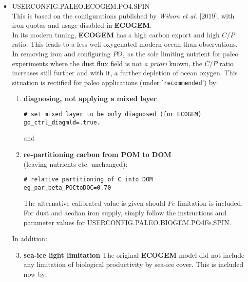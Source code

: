 \begin{itemize}[noitemsep]
\vspace{2mm}
\item \textsf{\small USERCONFIG.PALEO.ECOGEM.PO4.SPIN}
\vspace{1mm}
\\This is based on the configurations published by \textit{Wilson et al.} [2019], with iron quotas and usage disabled in \textbf{ECOGEM}.
\\In its modern tuning, \textbf{ECOGEM} has a high carbon export and high \(C/P\) ratio. This leads to a less well oxygenated modern ocean than observations. In removing iron and configuring \(PO_{4}\) as the sole limiting nutrient for paleo experiments where the dust flux field is not \textit{a priori} known, the \(C/P\) ratio increases still further and with it, a further depletion of ocean oxygen. This situation is rectified for paleo applications (under '\texttt{recommended}') by:
\begin{enumerate}[noitemsep]
\vspace{1mm}
\item \textbf{diagnosing, not applying a mixed layer}
\small\vspace{-1mm}\begin{verbatim}
# set mixed layer to be only diagnosed (for ECOGEM)
go_ctrl_diagmld=.true.
\end{verbatim}\vspace{-1mm}\normalsize
and
\vspace{1mm}
\item \textbf{re-partitioning carbon from POM to DOM}
\\(leaving nutrients etc. unchanged):
\small\vspace{-1mm}\begin{verbatim}
# relative partitioning of C into DOM
eg_par_beta_POCtoDOC=0.70
\end{verbatim}\vspace{-1mm}\normalsize
The alternative calibrated value is given should \(Fe\) limitation is included. For dust and aeolian iron supply, simply follow the instructions and parameter values for \linebreak \textsf{\footnotesize USERCONFIG.PALEO.BIOGEM.PO4Fe.SPIN}.
\end{enumerate}
In addition:
\begin{enumerate}[noitemsep]
\setcounter{enumi}{2}
\vspace{1mm}
\item \textbf{sea-ice light limitation}
The original \textbf{ECOGEM} model did not include any limitation of biological productivity by sea-ice cover. This is included now by:

\end{enumerate}
\end{itemize}
